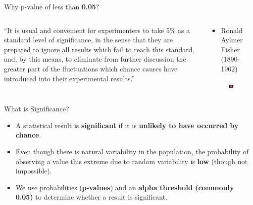 \documentclass[
  ignorenonframetext,
]{beamer}
\providecommand{\tightlist}{%
  \setlength{\itemsep}{0pt}\setlength{\parskip}{0pt}}
\begin{document}
\begin{frame}{Why p-value of less than \textbf{0.05}?}
\label{why-p-value-of-less-than-0.05}
\begin{columns}[T]
\begin{column}{0.48\textwidth}
``It is usual and convenient for experimenters to take 5\% as a standard
level of significance, in the sense that they are prepared to ignore all
results which fail to reach this standard, and, by this means, to
eliminate from further discussion the greater part of the fluctuations
which chance causes have introduced into their experimental results.''
\end{column}

\begin{column}{0.48\textwidth}
\begin{itemize}
\tightlist
\item
  Ronald Aylmer Fisher (1890-1962)
\end{itemize}

\begin{figure}
\includegraphics[width=0.8\linewidth]{figs/fisher} \end{figure}
\end{column}
\end{columns}
\end{frame}

\begin{frame}{What is Significance?}
\label{what-is-significance}
\begin{itemize}
\item
  A statistical result is \textbf{significant} if it is \textbf{unlikely
  to have occurred by chance}.
\item
  Even though there is natural variability in the population, the
  probability of observing a value this extreme due to random
  variability is \textbf{low} (though not impossible).
\end{itemize}

\begin{itemize}
\tightlist
\item
  We use probabilities (\textbf{p-values}) and an \textbf{alpha
  threshold (commonly 0.05)} to determine whether a result is
  significant.
\end{itemize}
\end{frame}
\end{document}
